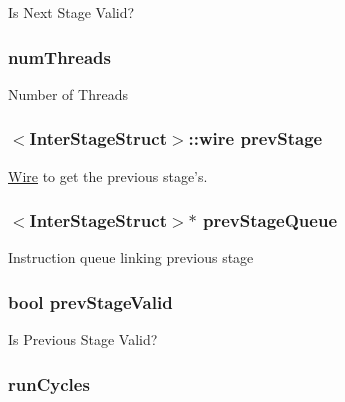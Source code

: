 \label{classPipelineStage_a74cfb32df253cbcbf5d70e6523492d2d}
Is Next Stage Valid? \hypertarget{classPipelineStage_a88377f855dbf5adeeecb06b5bb821d35}{
\subsubsection[{numThreads}]{ {\bf numThreads}}}
\label{classPipelineStage_a88377f855dbf5adeeecb06b5bb821d35}
Number of Threads \hypertarget{classPipelineStage_a560e9ae4ad5991a1789e95d33f59503b}{
\subsubsection[{prevStage}]{$<${\bf InterStageStruct}$>$::wire {\bf prevStage}}}
\label{classPipelineStage_a560e9ae4ad5991a1789e95d33f59503b}
\hyperlink{classWire}{Wire} to get the previous stage's. \hypertarget{classPipelineStage_af54931163e4bdb38a1295065af735582}{
\subsubsection[{prevStageQueue}]{$<${\bf InterStageStruct}$>$$\ast$ {\bf prevStageQueue}}}
\label{classPipelineStage_af54931163e4bdb38a1295065af735582}
Instruction queue linking previous stage \hypertarget{classPipelineStage_abb343738ea92390af4fbc30bc718d1bc}{
\subsubsection[{prevStageValid}]{\setlength{\rightskip}{0pt plus 5cm}bool {\bf prevStageValid}}}
\label{classPipelineStage_abb343738ea92390af4fbc30bc718d1bc}
Is Previous Stage Valid? \hypertarget{classPipelineStage_af9addd340a133c2f4add363a3055b019}{
\subsubsection[{runCycles}]{ {\bf runCycles}}}
